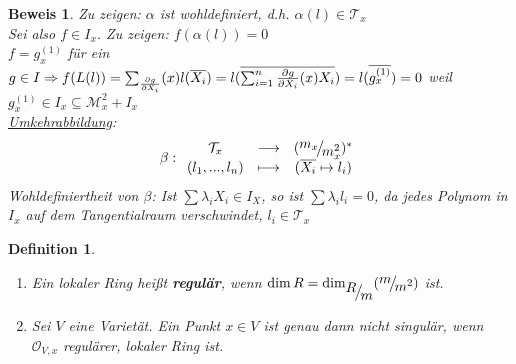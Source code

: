 \documentclass[a4paper,12pt]{report}
\theoremstyle{break}
\newtheorem{Def}{Definition}[section]
\theoremstyle{nonumberbreak}
\theoremstyle{nonumberplain}
\newtheorem{Bew}{Beweis}
\newcommand{\emp}[1]{\textbf{\emph{#1}}}
\newcommand{\begriff}[1]{{\index{#1}}\emp{#1}}
\newcommand{\Abb}[5]{\ensuremath{#1:\begin{array}{ccc} #2 & \longrightarrow & #3 \\ #4 & \longmapsto & #5 \end{array}}}
\newcommand{\FakRaum}[2]{
  \raisebox{0.7ex}{\ensuremath{#1}}
  \ensuremath{\mkern-3mu}\big/\ensuremath{\mkern-3mu}
  \raisebox{-0.6ex}{\ensuremath{#2}}}
\begin{document}
\begin{Bew}
Zu zeigen: $\alpha$ ist wohldefiniert, d.h. $\alpha(l)\in\mathcal T_x$\\
Sei also $f\in I_x$. Zu zeigen: $f(\alpha(l))=0$\\
$f=g_x^{(1)}$ für ein $g\in I\\
\Rightarrow f(L(l))=\sum_\frac{\partial g}{\partial X_i}(x)l(\overline{X_i})\\
=l(\overline{\sum_{i=1}^n\frac{\partial g}{\partial X_i}(x)X_i})\\
=l(\overline{g_x^{(1)}})=0$
weil $g_x^{(1)}\in I_x\subseteq\mathcal M_x^2+I_x$\\
\underline{Umkehrabbildung}: $$\Abb{\beta}{\mathcal T_x}{(\FakRaum{m_x}{m_x^2})^*}{(l_1,...,l_n)}{(\overline{X_i}\mapsto l_i)}$$
Wohldefiniertheit von $\beta$: Ist $\sum\lambda_iX_i\in I_X$, so ist $\sum\lambda_il_i=0$, da jedes Polynom in $I_x$ auf dem Tangentialraum verschwindet, $l_i\in\mathcal T_x$
\end{Bew}

\begin{Def}
\label{def:+Folgerung 16.5}
\begin{enumerate}
\item Ein lokaler Ring heißt \begriff{regulär}, wenn $\dim R=\dim_{\FakRaum{R}{m}}(\FakRaum{m}{m^2})$ ist.
\item Sei $V$ eine Varietät. Ein Punkt $x\in V$ ist genau dann nicht singulär, wenn $\mathcal O_{V,x}$ regulärer, lokaler Ring ist.
\end{enumerate}
\end{Def}


\end{document}
